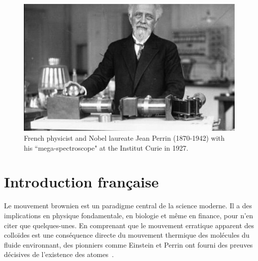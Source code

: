 \begin{figure}[h]
	\begin{center}
		\includegraphics[width=16cm]{02_body/introduction/image/perrin.jpg}
		\caption{French physicist and Nobel laureate Jean Perrin (1870-1942) with his ``mega-spectroscope" at the Institut Curie in 1927.}
	\end{center}
\end{figure}


\section{Introduction française}



Le mouvement brownien est un paradigme central de la science moderne. Il a des implications en physique fondamentale, en biologie et même en finance, pour n'en citer que quelques-unes. En comprenant que le mouvement erratique apparent des colloïdes est une conséquence directe du mouvement thermique des molécules du fluide environnant, des pionniers comme Einstein et Perrin ont fourni des preuves décisives de l'existence des atomes~\cite{einstein_uber_1905,perrin_les_2014}.

